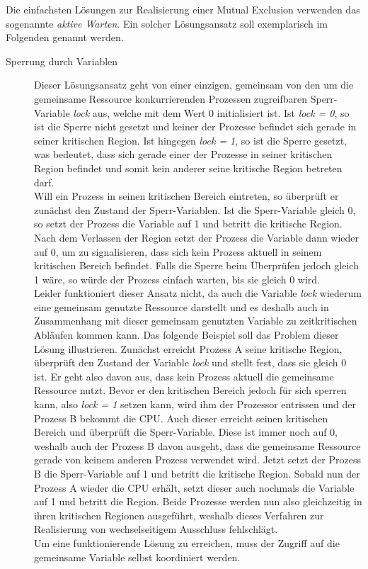 \begin{description}
						Die einfachsten Lösungen zur Realisierung einer Mutual Exclusion verwenden das sogenannte \textit{aktive Warten}. Ein solcher Lösungsansatz soll exemplarisch im Folgenden genannt werden.
					
						\begin{description}
							\item[Sperrung durch Variablen]
							
								Dieser Lösungsansatz geht von einer einzigen, gemeinsam von den um die gemeinsame Ressource konkurrierenden Prozessen zugreifbaren Sperr-Variable \textit{lock} aus, welche mit dem Wert 0 initialisiert ist. Ist \textit{lock = 0}, so ist die Sperre nicht gesetzt und keiner der Prozesse befindet sich gerade in seiner kritischen Region. Ist hingegen \textit{lock = 1}, so ist die Sperre gesetzt, was bedeutet, dass sich gerade einer der Prozesse in seiner kritischen Region befindet und somit kein anderer seine kritische Region betreten darf.\\
								Will ein Prozess in seinen kritischen Bereich eintreten, so überprüft er zunächst den Zustand der Sperr-Variablen. Ist die Sperr-Variable gleich 0, so setzt der Prozess die Variable auf 1 und betritt die kritische Region. Nach dem Verlassen der Region setzt der Prozess die Variable dann wieder auf 0, um zu signalisieren, dass sich kein Prozess aktuell in seinem kritischen Bereich befindet. Falls die Sperre beim Überprüfen jedoch gleich 1 wäre, so würde der Prozess einfach warten, bis sie gleich 0 wird.\\
								Leider funktioniert dieser Ansatz nicht, da auch die Variable \textit{lock} wiederum eine gemeinsam genutzte Ressource darstellt und es deshalb auch in Zusammenhang mit dieser gemeinsam genutzten Variable zu zeitkritischen Abläufen kommen kann. Das folgende Beispiel soll das Problem dieser Lösung illustrieren. Zunächst erreicht Prozess A seine kritische Region, überprüft den Zustand der Variable \textit{lock} und stellt fest, dass sie gleich 0 ist. Er geht also davon aus, dass kein Prozess aktuell die gemeinsame Ressource nutzt. Bevor er den kritischen Bereich jedoch für sich sperren kann, also \textit{lock = 1} setzen kann, wird ihm der Prozessor entrissen und der Prozess B bekommt die CPU. Auch dieser erreicht seinen kritischen Bereich und überprüft die Sperr-Variable. Diese ist immer noch auf 0, weshalb auch der Prozess B davon ausgeht, dass die gemeinsame Ressource gerade von keinem anderen Prozess verwendet wird. Jetzt setzt der Prozess B die Sperr-Variable auf 1 und betritt die kritische Region. Sobald nun der Prozess A wieder die CPU erhält, setzt dieser auch nochmals die Variable auf 1 und betritt die Region. Beide Prozesse werden nun also gleichzeitig in ihren kritischen Regionen ausgeführt, weshalb dieses Verfahren zur Realisierung von wechselseitigem Ausschluss fehlschlägt.\\
								Um eine funktionierende Lösung zu erreichen, muss der Zugriff auf die gemeinsame Variable selbst koordiniert werden. \cite{ModerneBetriebssysteme}
								

\end{description}
\end{description}
